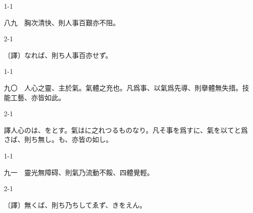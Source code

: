 \documentclass[tate,paper=b6j,jafontsize=9pt]{jlreq}
\begin{document}
\begin{azconvIndented}{1\zw}{-1\zw}

八九　胸次清快、則人事百艱亦不阻。

\end{azconvIndented}
\begin{azconvIndented}{2\zw}{-1\zw}

〔譯〕なれば、則ち人事百亦せず。

\end{azconvIndented}

\begin{azconvIndented}{1\zw}{-1\zw}

九〇　人心之靈、主於氣。氣體之充也。凡爲事、以氣爲先導、則擧體無失措。技能工藝、亦皆如此。

\end{azconvIndented}
\begin{azconvIndented}{2\zw}{-1\zw}

譯人心のは、をとす。氣はに之れつるものなり。凡そ事を爲すに、氣を以てと爲さば、則ち無し。も、亦皆の如し。

\end{azconvIndented}

\begin{azconvIndented}{1\zw}{-1\zw}

九一　靈光無障碍、則氣乃流動不餒、四體覺輕。

\end{azconvIndented}
\begin{azconvIndented}{2\zw}{-1\zw}

〔譯〕無くば、則ち乃ちしてゑず、きをえん。

\end{azconvIndented}
\end{document}
